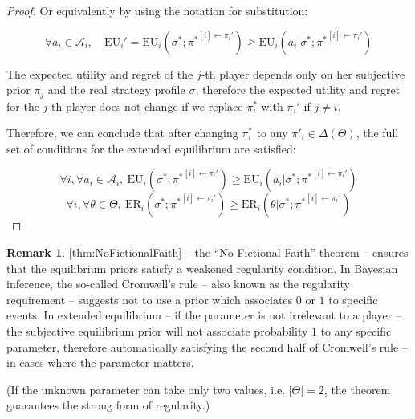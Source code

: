 \documentclass{article}
\theoremstyle{definition}
\newtheorem*{remark}{Remark}
\begin{document}
\begin{proof}
    Or equivalently by using the notation for substitution:
    
    \begin{equation}
        \forall a_i \in \mathcal{A}_i, \quad
        \mathrm{EU}_i' = \mathrm{EU}_i(\underline{\sigma}^*;{\underline{\pi}^*}^{[i] \leftarrow \pi_i'})  \ge \mathrm{EU}_i(a_i | \underline{\sigma}^*;{\underline{\pi}^*}^{[i] \leftarrow \pi_i'})
    \end{equation}

    The expected utility and regret of the $j$-th player depends only on her subjective prior $\pi_j$ and the real strategy profile $\underline{\sigma}$, therefore the expected utility and regret for the $j$-th player does not change if we replace $\pi_i^*$ with $\pi_i'$ if $j \ne i$.

    Therefore, we can conclude that after changing $\pi_i^*$ to any $\pi'_i \in \Delta(\Theta)$, the full set of conditions for the extended equilibrium are satisfied:

    \begin{equation}
        \forall i, \forall a_i \in \mathcal{A}_i, \  \mathrm{EU}_i(\underline{\sigma}^*;{\underline{\pi}^*}^{[i] \leftarrow \pi_i'}) \ge \mathrm{EU}_i(a_i | \underline{\sigma}^*;{\underline{\pi}^*}^{[i] \leftarrow \pi_i'})
    \end{equation}
    \begin{equation}
        \forall i, \forall \theta \in \Theta, \  \mathrm{ER}_i(\underline{\sigma}^*;{\underline{\pi}^*}^{[i] \leftarrow \pi_i'}) \ge \mathrm{ER}_i(\theta | \underline{\sigma}^*;{\underline{\pi}^*}^{[i] \leftarrow \pi_i'})
    \end{equation}
    
\end{proof}

\begin{remark}
    \autoref{thm:NoFictionalFaith} -- the ``No Fictional Faith'' theorem -- ensures that the equilibrium priors satisfy a weakened regularity condition. In Bayesian inference,
    the so-called Cromwell's rule \cite{book:Lindley,book:BayesianSocialScience} -- also known as the regularity requirement \cite{paper:Regularity} -- suggests not to use a prior which associates $0$ or $1$ to specific events.
    In extended equilibrium -- if the parameter is not irrelevant to a player -- the subjective equilibrium prior will not associate probability $1$ to any specific parameter, therefore automatically satisfying the second half of Cromwell's rule --in cases where the parameter matters.

    (If the unknown parameter can take only two values, i.e. $|\Theta|=2$, the theorem guarantees the strong form of regularity.)
    
\end{remark}
\end{document}
